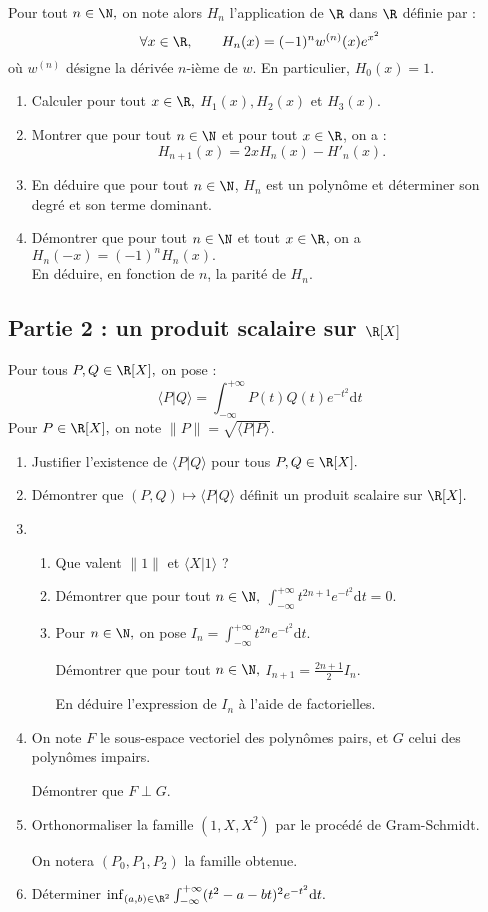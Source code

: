 \documentclass[twoside,french,11pt]{VcCours}
\newcommand{\dt}{\text{d}t}
\begin{document}
Pour tout $n\in\N,$ on note alors $H_n$ l'application  de $\R$ dans $\R$ définie par :
$$\forall x\in\R,\qquad H_n(x)=(-1)^nw^{(n)}(x)e^{x^2}$$
où $w^{(n)}$ désigne la dérivée $n$-ième de $w$. En particulier, $H_0(x)=1.$

\begin{enumerate}
	\item Calculer pour tout $x\in\R,$ $H_1(x), H_2(x)$ et $H_3(x).$
	\item Montrer que pour tout $n\in\N$ et pour tout $x\in\R$, on a :
	$$H_{n+1}(x)=2xH_n(x)-H'_n(x).$$
	\item En déduire que pour tout $n\in\N$, $H_n$ est un polynôme et déterminer son degré et son terme dominant.
	\item Démontrer que pour tout $n\in\N$ et tout $x\in\R$, on a $H_n(-x)=(-1)^nH_n(x).$\\
	En déduire, en fonction de $n$, la parité de $H_n.$
	
\end{enumerate}

\subsection*{Partie 2 : un produit scalaire sur $\R[X]$}

Pour tous $P,Q\in\R[X],$ on pose :
$$\langle P|Q\rangle=\int_{-\infty}^{+\infty}P(t)Q(t)e^{-t^2}\dt$$
Pour $P\in\R[X],$ on note $\|P\|=\sqrt{\langle P|P\rangle }.$
\begin{enumerate}
	\item Justifier l'existence de $\langle P|Q\rangle $ pour tous $P,Q\in\R[X].$
	\item Démontrer que $(P,Q)\longmapsto \langle P|Q\rangle $ définit un produit scalaire sur $\R[X].$
	\item
	\begin{enumerate}
		\item Que valent $\|1\|$ et $\langle X| 1\rangle $ ?
		\item Démontrer que pour tout $n\in\N,$ $\int_{-\infty}^{+\infty}t^{2n+1}e^{-t^2}\dt=0.$
		\item Pour $n\in\N,$ on pose $I_n=\int_{-\infty}^{+\infty}t^{2n}e^{-t^2}\dt.$

		Démontrer que pour tout $n\in\N,$ $I_{n+1}=\frac{2n+1}{2}I_n.$
		
		En déduire l'expression de $I_n$ à l'aide de factorielles.
\end{enumerate}
	\item On note $F$ le sous-espace vectoriel des polynômes pairs, et $G$ celui des polynômes impairs.

	Démontrer que $F\perp G.$
	\item Orthonormaliser la famille $(1,X,X^2)$ par le procédé de Gram-Schmidt.
	
	On notera $(P_0, P_1, P_2)$ la famille obtenue.
	\item Déterminer $\inf_{(a,b)\in\R^2}\int_{-\infty}^{+\infty}(t^2-a-bt)^2e^{-t^2} \dt.$
\end{enumerate}
 
\end{document}
